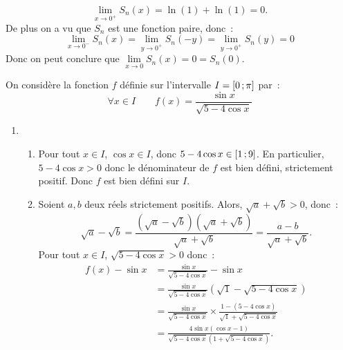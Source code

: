 \begin{corrige}
\begin{enumerate}
\begin{enumerate}
\begin{equation*}
            \lim\limits_{x \to 0^+} S_n(x) = \ln(1) + \ln(1) = 0.
          \end{equation*}
          De plus on a vu que \(S_n\) est une fonction paire, donc~:
          \begin{equation*}
            \lim\limits_{x \to 0^-} S_n(x) = \lim\limits_{y \to 0^+} S_n(-y) = 
          \lim\limits_{y \to 0^+} S_n(y) = 0 \end{equation*}
          Donc on peut conclure que \(\lim\limits_{x \to 0} S_n(x) = 0 = 
          S_n(0)\).
    \end{enumerate}
  \end{enumerate}
\end{corrige}

\begin{corrige}[Problème]
  On considère la fonction \(f\) définie sur l'intervalle \(I = 
  \left[ 0 \, ; {} \pi \right]\) par~:
  \begin{equation*}
    \forall x \in I \qquad f(x) = \frac{\sin x}{\sqrt{5-4\cos x}}
  \end{equation*}
  \begin{enumerate}
    \item
      \begin{enumerate}
        \item Pour tout \(x \in I\), \(\cos x \in I\), donc \(5-4\cos x \in 
          \left[ 1 \, ; {} 9 \right]\). En particulier, \(5-4\cos x >0\) donc le 
          dénominateur de \(f\) est bien défini, strictement positif. Donc \(f\) 
          est bien défini sur \(I\).
        \item Soient \(a, b\) deux réels strictement positifs. Alors, 
          \(\sqrt{a}+\sqrt{b} >0\), donc~:
          \begin{equation*}
            \sqrt{a}-\sqrt{b} = 
            \frac{(\sqrt{a}-\sqrt{b})(\sqrt{a}+\sqrt{b})}{\sqrt{a}+\sqrt{b}} = 
            \frac{a-b}{\sqrt{a}+\sqrt{b}}.
          \end{equation*}
          Pour tout \(x \in I\), \(\sqrt{5-4\cos x}>0\) donc~:
          \begin{align*}
            f(x)-\sin x &=\frac{\sin x}{\sqrt{5-4\cos x}} - \sin x \\
            &=\frac{\sin x}{\sqrt{5-4\cos x}}(\sqrt{1}- \sqrt{5-4\cos x}) \\
            &=\frac{\sin x}{\sqrt{5-4\cos x}} \times \frac{1-(5-4\cos 
            x)}{\sqrt{1}+\sqrt{5-4\cos x}} \\
            &=\frac{4\sin x (\cos x -1)}{\sqrt{5-4\cos x}(1+\sqrt{5-4\cos x})}.

\end{align*}
\end{enumerate}
\end{enumerate}
\end{corrige}
